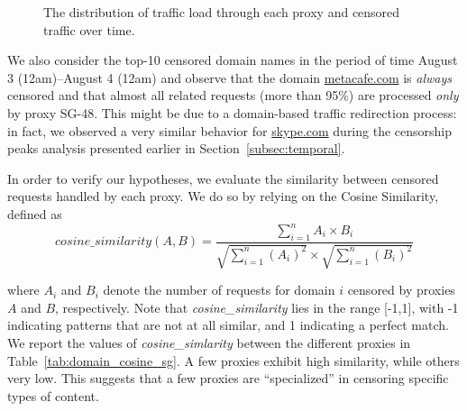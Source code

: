 \documentclass{sig-alternate-2013}
\begin{document}
\begin{figure}[t!]
  \begin{center}
	\end{center}
	\vspace{-0.6cm}
\caption{The distribution of traffic load through each proxy  and censored traffic over time.}
	\label{fig:tempSG}
\end{figure}


We also consider the top-10 censored domain names in the period of time August 3 (12am)--August 4 (12am) and observe that the domain \url{metacafe.com} is \textit{always} censored and that almost all related requests (more than 95\%) are  processed {\em only} by proxy SG-48. This might be due to a domain-based traffic redirection process: in fact, we observed a very similar behavior for \url{skype.com} during the censorship peaks analysis presented earlier in Section~\ref{subsec:temporal}. 


In order to verify our hypotheses, we evaluate the similarity between censored requests handled by each proxy. We do so by relying on the Cosine Similarity, defined as
{\small
$$cosine\_similarity(A,B)=\frac{\sum_{i=1}^{n}A_i\times B_i}{\sqrt{\sum_{i=1}^{n}(A_i)^2}\times \sqrt{\sum_{i=1}^{n}(B_i)^2}}$$
}


\noindent where $A_i$ and $B_i$ denote the number of requests for domain $i$ censored by proxies $A$ and $B$, respectively. Note that {\em cosine\_similarity} lies in the range [-1,1], with -1 indicating patterns that are not at all similar, and 1 indicating a perfect match. 
We report the values of {\em cosine\_simlarity} between the different proxies in Table~\ref{tab:domain_cosine_sg}. A few proxies exhibit high similarity, while others very low. This suggests that a few proxies are ``specialized'' in censoring specific types of content. 
\end{document}
